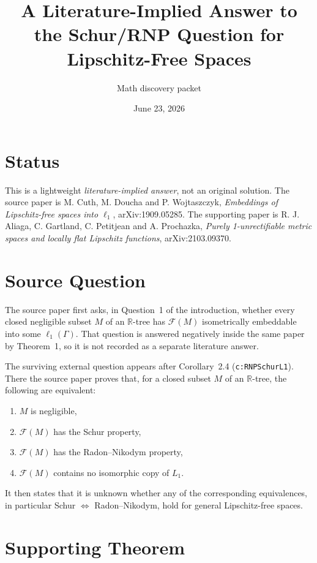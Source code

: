 \documentclass[11pt]{article}
\title{A Literature-Implied Answer to the Schur/RNP Question for Lipschitz-Free Spaces}
\author{Math discovery packet}
\date{June 23, 2026}
\newcommand{\Free}{\mathcal{F}}
\newcommand{\R}{\mathbb{R}}
\begin{document}
\maketitle

\section{Status}

This is a lightweight \emph{literature-implied answer}, not an original
solution.  The source paper is M. Cuth, M. Doucha and P. Wojtaszczyk,
\emph{Embeddings of Lipschitz-free spaces into \(\ell_1\)},
arXiv:1909.05285.  The supporting paper is R. J. Aliaga, C. Gartland,
C. Petitjean and A. Prochazka, \emph{Purely 1-unrectifiable metric spaces
and locally flat Lipschitz functions}, arXiv:2103.09370.

\section{Source Question}

The source paper first asks, in Question~1 of the introduction, whether every
closed negligible subset \(M\) of an \(\R\)-tree has \(\Free(M)\)
isometrically embeddable into some \(\ell_1(\Gamma)\).  That question is
answered negatively inside the same paper by Theorem~1, so it is not recorded
as a separate literature answer.

The surviving external question appears after Corollary~2.4
(\texttt{c:RNPSchurL1}).  There the source paper proves that, for a closed
subset \(M\) of an \(\R\)-tree, the following are equivalent:
\begin{enumerate}[leftmargin=*]
\item \(M\) is negligible,
\item \(\Free(M)\) has the Schur property,
\item \(\Free(M)\) has the Radon--Nikodym property,
\item \(\Free(M)\) contains no isomorphic copy of \(L_1\).
\end{enumerate}
It then states that it is unknown whether any of the corresponding
equivalences, in particular Schur \(\Longleftrightarrow\) Radon--Nikodym, hold
for general Lipschitz-free spaces.

\section{Supporting Theorem}
\end{document}
